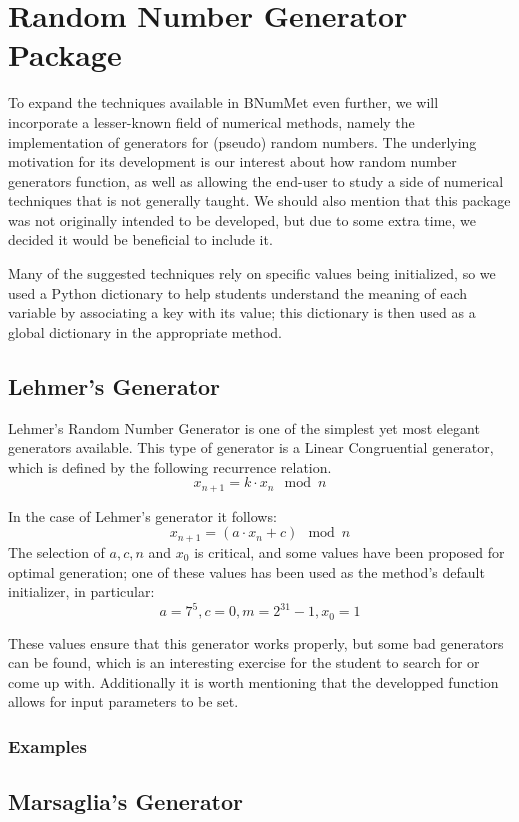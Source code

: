\section{Random Number Generator Package}
To expand the techniques available in BNumMet even further, we will incorporate a lesser-known field of numerical methods, namely the implementation of generators for (pseudo) random numbers. The underlying motivation for its development is our interest about how random number generators function, as well as allowing the end-user to study a side of numerical techniques that is not generally taught. We should also mention that this package was not originally intended to be developed, but due to some extra time, we decided it would be beneficial to include it.

Many of the suggested techniques rely on specific values being initialized, so we used a Python dictionary to help students understand the meaning of each variable by associating a key with its value; this dictionary is then used as a global dictionary in the appropriate method.

\subsection{Lehmer's Generator}
Lehmer's Random Number Generator is one of the simplest yet most elegant generators available. This type of generator is a Linear Congruential generator, which is defined by the following recurrence relation. \cite{payne1969coding} \cite{park1988random}
\[x_{n+1} = k\cdot x_n \mod{n}\]

In the case of Lehmer's generator it follows:
\[x_{n+1} = (a\cdot x_n+c) \mod{n}\]
The selection of $a,c,n$ and $x_0$ is critical, and some values have been proposed for optimal generation; one of these values has been used as the method's default initializer, in particular:
\[a= 7^5, c=0, m=2^{31}-1, x_0 = 1 \]

These values ensure that this generator works properly, but some bad generators can be found, which is an interesting exercise for the student to search for or come up with. Additionally it is worth mentioning that the developped function allows for input parameters to be set.
\subsubsection{Examples}
	


\subsection{Marsaglia's Generator}

